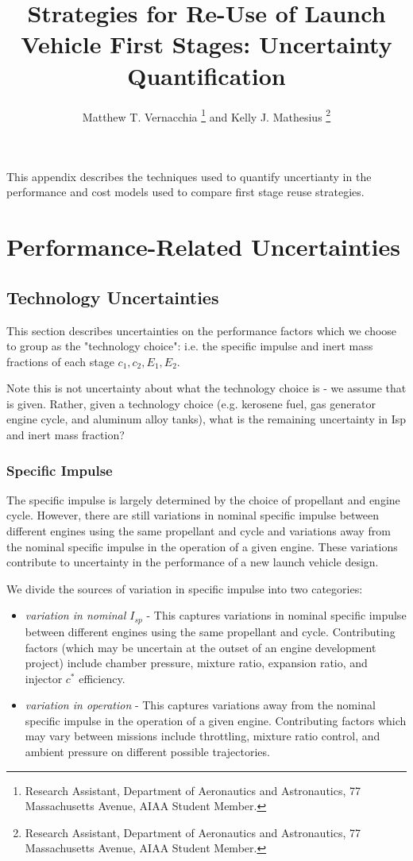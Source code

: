 \documentclass[conf]{../new-aiaa}
\title{Strategies for Re-Use of Launch Vehicle First Stages: Uncertainty Quantification}
\author{Matthew T. Vernacchia \footnote{Research Assistant, Department of Aeronautics and Astronautics, 77 Massachusetts Avenue, AIAA Student Member.}
and Kelly J. Mathesius  \footnote{Research Assistant, Department of Aeronautics and Astronautics, 77 Massachusetts Avenue, AIAA Student Member.}}
\affil{Massachusetts Institute of Technology, Cambridge, MA, 02139}
\begin{document}
\maketitle

This appendix describes the techniques used to quantify uncertianty in the performance and cost models used to compare first stage reuse strategies.

\section{Performance-Related Uncertainties}

\subsection{Technology Uncertainties}
This section describes uncertainties on the performance factors which we choose to group as the "technology choice": i.e. the specific impulse and inert mass fractions of each stage $c_1, c_2, E_1, E_2$.

Note this is not uncertainty about what the technology choice is - we assume that is given. Rather, given a technology choice (e.g. kerosene fuel, gas generator engine cycle, and aluminum alloy tanks), what is the remaining uncertainty in Isp and inert mass fraction?

\subsubsection{Specific Impulse}
The specific impulse is largely determined by the choice of propellant and engine cycle. However, there are still variations in nominal specific impulse between different engines using the same propellant and cycle and variations away from the nominal specific impulse in the operation of a given engine. These variations contribute to uncertainty in the performance of a new launch vehicle design.

We divide the sources of variation in specific impulse into two categories:
\begin{itemize}
    \item \emph{variation in nominal $I_{sp}$} -  This captures variations in nominal specific impulse between different engines using the same propellant and cycle. Contributing factors (which may be uncertain at the outset of an engine development project) include chamber pressure, mixture ratio, expansion ratio, and injector $c^*$ efficiency.
    \item \emph{variation in operation} -  This captures variations away from the nominal specific impulse in the operation of a given engine. Contributing factors which may vary between missions include throttling, mixture ratio control, and ambient pressure on different possible trajectories.
\end{itemize}
\end{document}
